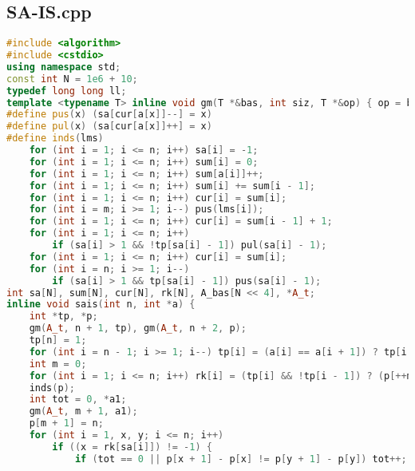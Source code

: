 \documentclass[9pt, a4paper, oneside]{book}
\begin{document}
\subsection{SA-IS.cpp}
\begin{lstlisting}[language={C++}]
#include <algorithm>
#include <cstdio>
using namespace std;
const int N = 1e6 + 10;
typedef long long ll;
template <typename T> inline void gm(T *&bas, int siz, T *&op) { op = bas, bas += siz; }
#define pus(x) (sa[cur[a[x]]--] = x)
#define pul(x) (sa[cur[a[x]]++] = x)
#define inds(lms)                                                                                                      \
    for (int i = 1; i <= n; i++) sa[i] = -1;                                                                           \
    for (int i = 1; i <= n; i++) sum[i] = 0;                                                                           \
    for (int i = 1; i <= n; i++) sum[a[i]]++;                                                                          \
    for (int i = 1; i <= n; i++) sum[i] += sum[i - 1];                                                                 \
    for (int i = 1; i <= n; i++) cur[i] = sum[i];                                                                      \
    for (int i = m; i >= 1; i--) pus(lms[i]);                                                                          \
    for (int i = 1; i <= n; i++) cur[i] = sum[i - 1] + 1;                                                              \
    for (int i = 1; i <= n; i++)                                                                                       \
        if (sa[i] > 1 && !tp[sa[i] - 1]) pul(sa[i] - 1);                                                               \
    for (int i = 1; i <= n; i++) cur[i] = sum[i];                                                                      \
    for (int i = n; i >= 1; i--)                                                                                       \
        if (sa[i] > 1 && tp[sa[i] - 1]) pus(sa[i] - 1);
int sa[N], sum[N], cur[N], rk[N], A_bas[N << 4], *A_t;
inline void sais(int n, int *a) {
    int *tp, *p;
    gm(A_t, n + 1, tp), gm(A_t, n + 2, p);
    tp[n] = 1;
    for (int i = n - 1; i >= 1; i--) tp[i] = (a[i] == a[i + 1]) ? tp[i + 1] : (a[i] < a[i + 1]);
    int m = 0;
    for (int i = 1; i <= n; i++) rk[i] = (tp[i] && !tp[i - 1]) ? (p[++m] = i, m) : -1;
    inds(p);
    int tot = 0, *a1;
    gm(A_t, m + 1, a1);
    p[m + 1] = n;
    for (int i = 1, x, y; i <= n; i++)
        if ((x = rk[sa[i]]) != -1) {
            if (tot == 0 || p[x + 1] - p[x] != p[y + 1] - p[y]) tot++;

\end{lstlisting}
\end{document}
